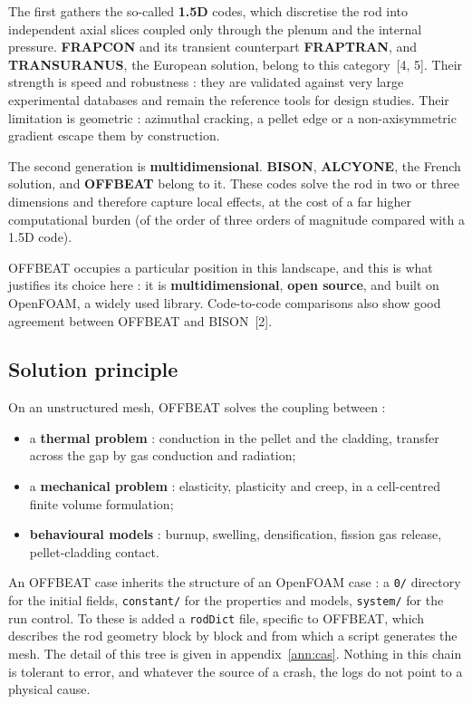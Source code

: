 The first gathers the so-called \textbf{1.5D} codes, which discretise the rod
into independent axial slices coupled only through the plenum and the internal
pressure. \textbf{FRAPCON} and its transient counterpart \textbf{FRAPTRAN}, and
\textbf{TRANSURANUS}, the European solution, belong to this category~[4, 5].
Their strength is speed and robustness : they are validated against very large
experimental databases and remain the reference tools for design studies. Their
limitation is geometric : azimuthal cracking, a pellet edge or a non-axisymmetric
gradient escape them by construction.

The second generation is \textbf{multidimensional}. \textbf{BISON},
\textbf{ALCYONE}, the French solution, and \textbf{OFFBEAT} belong to it. These
codes solve the rod in two or three dimensions and therefore capture local
effects, at the cost of a far higher computational burden (of the order of three
orders of magnitude compared with a 1.5D code).

OFFBEAT occupies a particular position in this landscape, and this is what
justifies its choice here : it is \textbf{multidimensional}, \textbf{open
source}, and built on OpenFOAM, a widely used library. Code-to-code comparisons
also show good agreement between OFFBEAT and BISON~[2].

\subsection{Solution principle}

On an unstructured mesh, OFFBEAT solves the coupling between :
\begin{itemize}
  \item a \textbf{thermal problem} : conduction in the pellet and the cladding,
    transfer across the gap by gas conduction and radiation;
  \item a \textbf{mechanical problem} : elasticity, plasticity and creep, in a
    cell-centred finite volume formulation;
  \item \textbf{behavioural models} : burnup, swelling, densification, fission
    gas release, pellet-cladding contact.
\end{itemize}

An OFFBEAT case inherits the structure of an OpenFOAM case : a
\texttt{0/} directory for the initial fields, \texttt{constant/} for the
properties and models, \texttt{system/} for the run control. To these is added a
\texttt{rodDict} file, specific to OFFBEAT, which describes the rod geometry
block by block and from which a script generates the mesh. The detail of this
tree is given in appendix~\ref{ann:cas}. Nothing in this chain is tolerant to
error, and whatever the source of a crash, the logs do not point to a physical
cause.

